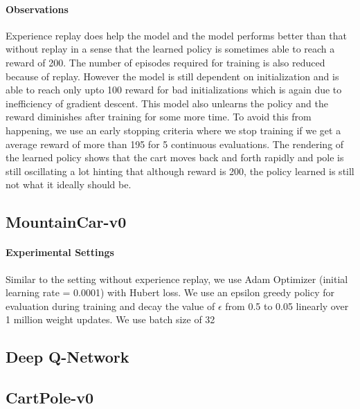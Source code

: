 \documentclass[12pt]{article}
\begin{document}
\paragraph{Observations} Experience replay does help the model and the model performs better than that without replay in a sense that the learned policy is sometimes able to reach a reward of 200. The number of episodes required for training is also reduced because of replay. However the model is still dependent on initialization and is able to reach only upto 100 reward for bad initializations which is again due to inefficiency of gradient descent. This model also unlearns the policy and the reward diminishes after training for some more time. To avoid this from happening, we use an early stopping criteria where we stop training if we get a average reward of more than 195 for 5 continuous evaluations. The rendering of the learned policy shows that the cart moves back and forth rapidly and pole is still oscillating a lot hinting that although reward is 200, the policy learned is still not what it ideally should be.

\pagebreak[4]
\subsection*{MountainCar-v0}

\paragraph{Experimental Settings} Similar to the setting without experience replay, we use Adam Optimizer (initial learning rate = 0.0001) with Hubert loss. We use an epsilon greedy policy for evaluation during training and decay the value of $\epsilon$ from 0.5 to 0.05 linearly over 1 million weight updates. We use batch size of 32

\pagebreak[4]
\subsection{Deep Q-Network}
\subsection*{CartPole-v0}
\end{document}

